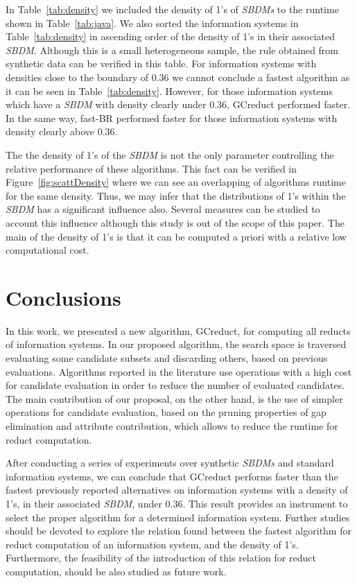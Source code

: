\documentclass[number,preprint,review,12pt]{elsarticle}
\begin{document}
	In Table~\ref{tab:density} we included the density of 1's of \textit{SBDMs} to the runtime shown in Table~\ref{tab:java}. We also sorted the information systems in Table~\ref{tab:density} in ascending order of the density of 1's in their associated \textit{SBDM}. Although this is a small heterogeneous sample, the rule obtained from synthetic data can be verified in this table. For information systems with densities close to the boundary of 0.36 we cannot conclude a fastest algorithm as it can be seen in Table~\ref{tab:density}. However, for those information systems which have a \textit{SBDM} with density clearly under 0.36, GCreduct performed faster. In the same way, fast-BR performed faster for those information systems with density clearly above 0.36.
	
	The the density of 1's of the \textit{SBDM} is not the only parameter controlling the relative performance of these algorithms. This fact can be verified in Figure~\ref{fig:scattDensity} where we can see an overlapping of algorithms runtime for the same density. Thus, we may infer that the distributions of 1's within the \textit{SBDM} has a significant influence also. Several measures can be studied to account this influence although this study is out of the scope of this paper. The main of the density of 1's is that it can be computed a priori with a relative low computational cost.

\section{Conclusions}\label{conclusions}
	In this work, we presented a new algorithm, GCreduct, for computing all reducts of information systems. In our proposed algorithm, the search space is traversed evaluating some candidate subsets and discarding others, based on previous evaluations. Algorithms reported in the literature use operations with a high cost for candidate evaluation in order to reduce the number of evaluated candidates. The main contribution of our proposal, on the other hand, is the use of simpler operations for candidate evaluation, based on the pruning properties of gap elimination and attribute contribution, which allows to reduce the runtime for reduct computation. 
	
	After conducting a series of experiments over synthetic \textit{SBDMs} and standard information systems, we can conclude that GCreduct performs faster than the fastest previously reported alternatives on information systems with a density of 1's, in their associated \textit{SBDM}, under 0.36. This result provides an instrument to select the proper algorithm for a determined information system. Further studies should be devoted to explore the relation found between the fastest algorithm for reduct computation of an information system, and the density of 1's. Furthermore, the feasibility of the introduction of this relation for reduct computation, should be also studied as future work.
\end{document}
